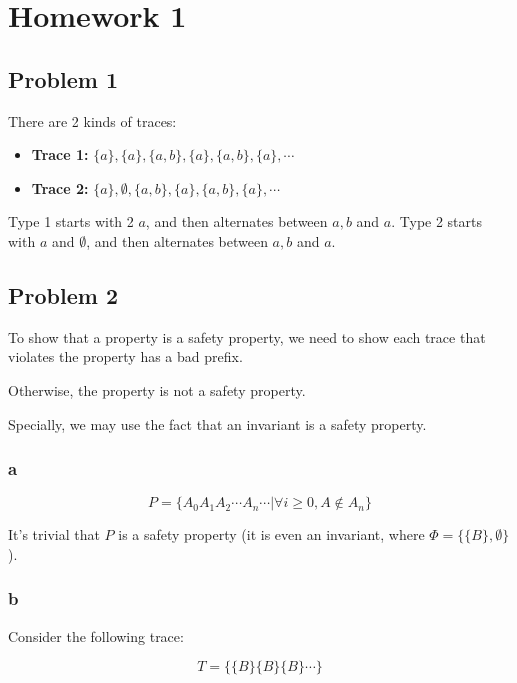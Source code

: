 \chapter{Homework 1}

\section{Problem 1}

There are 2 kinds of traces:

\begin{itemize}
    \item \textbf{Trace 1:} $\{a\}, \{a\}, \{a, b\}, \{a\}, \{a, b\}, \{a\}, \cdots$
    \item \textbf{Trace 2:} $\{a\}, \emptyset, \{a, b\}, \{a\}, \{a, b\}, \{a\}, \cdots$
\end{itemize}

Type 1 starts with 2 $a$, and then alternates between $a, b$ and $a$.
Type 2 starts with $a$ and $\emptyset$, and then alternates between $a, b$ and $a$.

\section{Problem 2}

To show that a property is a safety property, we need to show each trace that violates the property has a bad prefix.

Otherwise, the property is not a safety property.

Specially, we may use the fact that an invariant is a safety property.

\subsection{a}

\newcommand{\A}{\{A\}}
\newcommand{\B}{\{B\}}

$$
P = \{A_0 A_1 A_2 \cdots A_n \cdots | \forall i \ge 0,  A \notin A_n \}
$$

It's trivial that $P$ is a safety property (it is even an invariant, where $\Phi = \{\B, \emptyset \}$).

\subsection{b}

Consider the following trace:

$$
T = \{\B \B \B \cdots \}
$$

